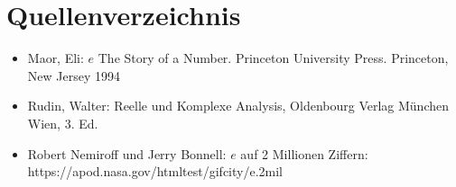 \section{Quellenverzeichnis}
\begin{itemize}
  \item Maor, Eli: $e$ The Story of a Number. Princeton University Press. Princeton, New Jersey 1994
  \item Rudin, Walter: Reelle und Komplexe Analysis, Oldenbourg Verlag München Wien, 3. Ed.
  \item  Robert Nemiroff und Jerry Bonnell: $e$ auf 2 Millionen Ziffern: https://apod.nasa.gov/htmltest/gifcity/e.2mil

\end{itemize}
